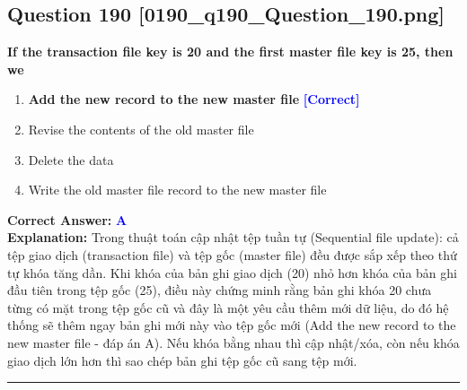 \documentclass[11pt,a4paper]{article}
\begin{document}
\begin{minipage}{\textwidth}
\subsection*{Question 190 \quad \footnotesize{[0190\_q190\_Question\_190.png]}}
\noindent \textbf{If the transaction file key is 20 and the first master file key is 25, then we}

\begin{enumerate}[label=\Alph*.]
    \item \textbf{Add the new record to the new master file} \hfill \textcolor{blue}{\textbf{[Correct]}}
    \item Revise the contents of the old master file
    \item Delete the data
    \item Write the old master file record to the new master file
\end{enumerate}

\noindent \textbf{Correct Answer:} \textcolor{blue}{\textbf{A}} \\[2pt]
\noindent \textbf{Explanation:} Trong thuật toán cập nhật tệp tuần tự (Sequential file update): cả tệp giao dịch (transaction file) và tệp gốc (master file) đều được sắp xếp theo thứ tự khóa tăng dần. Khi khóa của bản ghi giao dịch (20) nhỏ hơn khóa của bản ghi đầu tiên trong tệp gốc (25), điều này chứng minh rằng bản ghi khóa 20 chưa từng có mặt trong tệp gốc cũ và đây là một yêu cầu thêm mới dữ liệu, do đó hệ thống sẽ thêm ngay bản ghi mới này vào tệp gốc mới (Add the new record to the new master file - đáp án A). Nếu khóa bằng nhau thì cập nhật/xóa, còn nếu khóa giao dịch lớn hơn thì sao chép bản ghi tệp gốc cũ sang tệp mới.

\par\vspace{0.3cm}
\hrule
\vspace{0.3cm}
\end{minipage}
\end{document}
